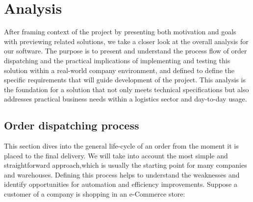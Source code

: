 \chapter{Analysis}
\label{chap:analysis}
After framing context of the project by presenting both motivation and goals with previewing related solutions, we take a closer look at the overall analysis for our software.
The purpose is to present and understand the process flow of order dispatching and the practical implications of implementing and testing this solution within a real-world company environment, and defined to define the specific requirements that will guide development of the project.
This analysis is the foundation for a solution that not only meets technical specifications but also addresses practical business needs within a logistics sector and day-to-day usage.


\section{Order dispatching process}
\label{sec:order-dispatching-process}
This section dives into the general life-cycle of an order from the moment it is placed to the final delivery.
We will take into account the most simple and straightforward approach,which is usually the starting point for many companies and warehouses.
Defining this process helps to understand the weaknesses and identify opportunities for automation and efficiency improvements.
Suppose a customer of a company is shopping in an e-Commerce store:

